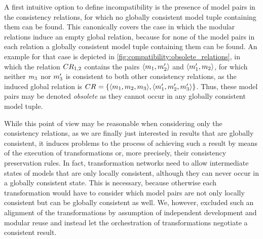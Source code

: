A first intuitive option to define incompatibility is the presence of model pairs in the consistency relations, for which no globally consistent model tuple containing them can be found.
This canonically covers the case in which the modular relations induce an empty global relation, because for none of the model pairs in each relation a globally consistent model tuple containing them can be found.
An example for that case is depicted in \autoref{fig:compatibility:obsolete_relations}, in which the relation $\consistencyrelation{CR}{1,2}$ contains the pairs $\tupled{\model{m}{1}, \model{m}{2}'}$ and $\tupled{\model{m}{1}', \model{m}{2}}$, for which neither $\model{m}{3}$ nor $\model{m}{3}'$ is consistent to both other consistency relations, as the induced global relation is $\consistencyrelation{CR}{} = \setted{\tupled{\model{m}{1},\model{m}{2},\model{m}{3}},\tupled{\model{m}{1}',\model{m}{2}',\model{m}{3}'}}$.
Thus, these model pairs may be denoted \emph{obsolete} as they cannot occur in any globally consistent model tuple.

While this point of view may be reasonable when considering only the consistency relations, as we are finally just interested in results that are globally consistent, it induces problems to the process of achieving such a result by means of the execution of transformations or, more precisely, their consistency preservation rules.
In fact, transformation networks need to allow intermediate states of models that are only locally consistent, although they can never occur in a globally consistent state.
This is necessary, because otherwise each transformation would have to consider which model pairs are not only locally consistent but can be globally consistent as well.
We, however, excluded such an alignment of the transformations by assumption of independent development and modular reuse and instead let the orchestration of transformations negotiate a consistent result.

